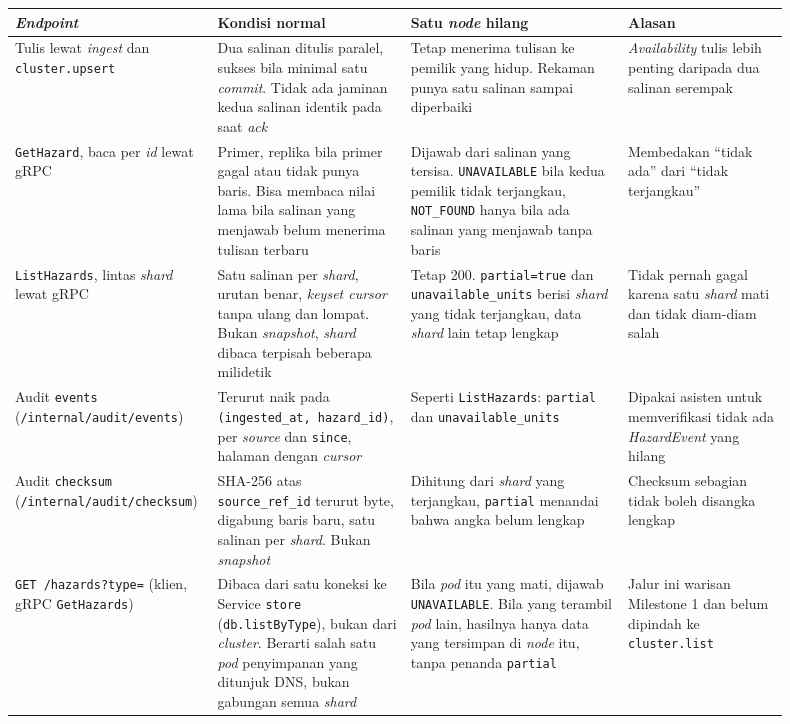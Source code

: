 \begin{longtable}[]{|>{\raggedright\arraybackslash}p{0.19\linewidth}|>{\raggedright\arraybackslash}p{0.24\linewidth}|>{\raggedright\arraybackslash}p{0.27\linewidth}|>{\raggedright\arraybackslash}p{0.2\linewidth}|}
\hline
\textbf{\textit{Endpoint}} & \textbf{Kondisi normal} & \textbf{Satu \textit{node} hilang} & \textbf{Alasan} \\
\hline
\endhead
Tulis lewat \textit{ingest} dan \texttt{cluster.upsert} & Dua salinan ditulis paralel, sukses bila minimal satu \textit{commit}. Tidak ada jaminan kedua salinan identik pada saat \textit{ack} & Tetap menerima tulisan ke pemilik yang hidup. Rekaman punya satu salinan sampai diperbaiki & \textit{Availability} tulis lebih penting daripada dua salinan serempak \\
\hline
\texttt{GetHazard}, baca per \textit{id} lewat gRPC & Primer, replika bila primer gagal atau tidak punya baris. Bisa membaca nilai lama bila salinan yang menjawab belum menerima tulisan terbaru & Dijawab dari salinan yang tersisa. \texttt{UNAVAILABLE} bila kedua pemilik tidak terjangkau, \texttt{NOT\_FOUND} hanya bila ada salinan yang menjawab tanpa baris & Membedakan ``tidak ada'' dari ``tidak terjangkau'' \\
\hline
\texttt{ListHazards}, lintas \textit{shard} lewat gRPC & Satu salinan per \textit{shard}, urutan benar, \textit{keyset cursor} tanpa ulang dan lompat. Bukan \textit{snapshot}, \textit{shard} dibaca terpisah beberapa milidetik & Tetap 200. \texttt{partial=true} dan \texttt{unavailable\_units} berisi \textit{shard} yang tidak terjangkau, data \textit{shard} lain tetap lengkap & Tidak pernah gagal karena satu \textit{shard} mati dan tidak diam-diam salah \\
\hline
Audit \texttt{events} (\texttt{/internal/audit/events}) & Terurut naik pada \texttt{(ingested\_at, hazard\_id)}, per \textit{source} dan \texttt{since}, halaman dengan \textit{cursor} & Seperti \texttt{ListHazards}: \texttt{partial} dan \texttt{unavailable\_units} & Dipakai asisten untuk memverifikasi tidak ada \textit{HazardEvent} yang hilang \\
\hline
Audit \texttt{checksum} (\texttt{/internal/audit/checksum}) & SHA-256 atas \texttt{source\_ref\_id} terurut byte, digabung baris baru, satu salinan per \textit{shard}. Bukan \textit{snapshot} & Dihitung dari \textit{shard} yang terjangkau, \texttt{partial} menandai bahwa angka belum lengkap & Checksum sebagian tidak boleh disangka lengkap \\
\hline
\texttt{GET /hazards?type=} (klien, gRPC \texttt{GetHazards}) & Dibaca dari satu koneksi ke Service \texttt{store} (\texttt{db.listByType}), bukan dari \textit{cluster}. Berarti salah satu \textit{pod} penyimpanan yang ditunjuk DNS, bukan gabungan semua \textit{shard} & Bila \textit{pod} itu yang mati, dijawab \texttt{UNAVAILABLE}. Bila yang terambil \textit{pod} lain, hasilnya hanya data yang tersimpan di \textit{node} itu, tanpa penanda \texttt{partial} & Jalur ini warisan Milestone 1 dan belum dipindah ke \texttt{cluster.list} \\
\hline
\end{longtable}

